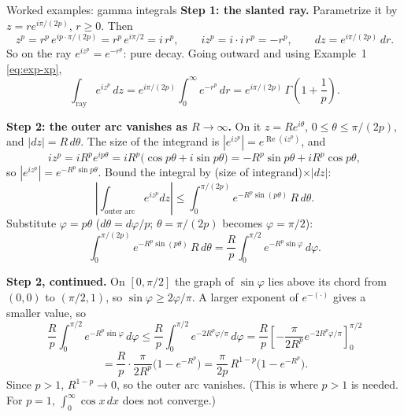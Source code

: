 \documentclass[11pt]{beamer}
\begin{document}
\begin{frame}[allowframebreaks=1.00]{Worked examples: gamma integrals}
\textbf{Step 1: the slanted ray.} Parametrize it by \(z=re^{i\pi/(2p)}\), \(r\ge0\). Then
\[
  z^p=r^p\,e^{ip\cdot\pi/(2p)}=r^p\,e^{i\pi/2}=i\,r^p,
  \qquad
  iz^p=i\cdot i\,r^p=-r^p,
  \qquad
  dz=e^{i\pi/(2p)}\,dr .
\]
So on the ray \(e^{iz^p}=e^{-r^p}\): pure decay. Going outward and using Example~1 \eqref{eq:exp-xp},
\[
  \int_{\mathrm{ray}}e^{iz^p}\,dz
   =e^{i\pi/(2p)}\int_0^\infty e^{-r^p}\,dr
   =e^{i\pi/(2p)}\,\Gamma\left(1+\frac1p\right).
\]
\par\framebreak\par
\textbf{Step 2: the outer arc vanishes as \(R\to\infty\).} On it \(z=Re^{i\theta}\),
\(0\le\theta\le\pi/(2p)\), and \(|dz|=R\,d\theta\). The size of the integrand is
\(|e^{iz^p}|=e^{\operatorname{Re}(iz^p)}\), and
\[
 iz^p=iR^pe^{ip\theta}=iR^p\bigl(\cos p\theta+i\sin p\theta\bigr)
 =-R^p\sin p\theta+iR^p\cos p\theta,
\]
so \(|e^{iz^p}|=e^{-R^p\sin p\theta}\). Bound the integral by (size of integrand)\(\times|dz|\):
\[
 \left|\int_{\text{outer arc}}e^{iz^p}dz\right|
 \le\int_0^{\pi/(2p)}e^{-R^p\sin(p\theta)}\,R\,d\theta .
\]
Substitute \(\varphi=p\theta\) (\(d\theta=d\varphi/p\); \(\theta=\pi/(2p)\) becomes \(\varphi=\pi/2\)):
\[
 \int_0^{\pi/(2p)}e^{-R^p\sin(p\theta)}\,R\,d\theta
 =\frac Rp\int_0^{\pi/2}e^{-R^p\sin\varphi}\,d\varphi .
\]
\par\framebreak\par
\textbf{Step 2, continued.} On \([0,\pi/2]\) the graph of \(\sin\varphi\) lies above its chord from
\((0,0)\) to \((\pi/2,1)\), so \(\sin\varphi\ge2\varphi/\pi\). A larger exponent of \(e^{-(\cdot)}\) gives a smaller value, so
\[
 \frac Rp\int_0^{\pi/2}e^{-R^p\sin\varphi}\,d\varphi
 \le\frac Rp\int_0^{\pi/2}e^{-2R^p\varphi/\pi}\,d\varphi
 =\frac Rp\left[-\frac{\pi}{2R^p}e^{-2R^p\varphi/\pi}\right]_0^{\pi/2}
\]
\[
 =\frac Rp\cdot\frac{\pi}{2R^p}\bigl(1-e^{-R^p}\bigr)
 =\frac{\pi}{2p}\,R^{1-p}\bigl(1-e^{-R^p}\bigr).
\]
Since \(p>1\), \(R^{1-p}\to0\), so the outer arc vanishes. (This is where \(p>1\) is needed. For
\(p=1\), \(\int_0^\infty\cos x\,dx\) does not converge.)


\end{frame}
\end{document}
